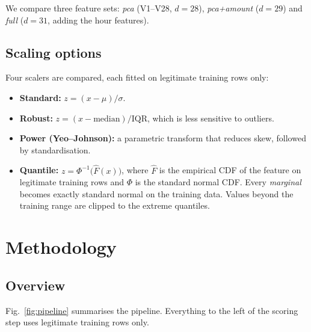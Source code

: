 \documentclass[12pt]{article}
\begin{document}
We compare three feature sets: \emph{pca} (V1--V28, $d{=}28$), \emph{pca+amount} ($d{=}29$) and \emph{full}
($d{=}31$, adding the hour features).

\subsection{Scaling options}
Four scalers are compared, each fitted on legitimate training rows only:
\begin{itemize}
\item \textbf{Standard:} $z=(x-\mu)/\sigma$.
\item \textbf{Robust:} $z=(x-\text{median})/\text{IQR}$, which is less sensitive to outliers.
\item \textbf{Power (Yeo--Johnson):} a parametric transform that reduces skew, followed by standardisation.
\item \textbf{Quantile:} $z=\Phi^{-1}\big(\hat F(x)\big)$, where $\hat F$ is the empirical CDF of the feature on
legitimate training rows and $\Phi$ is the standard normal CDF. Every \emph{marginal} becomes exactly standard normal
on the training data. Values beyond the training range are clipped to the extreme quantiles.
\end{itemize}

\section{Methodology}\label{sec:method}

\subsection{Overview}
Fig.~\ref{fig:pipeline} summarises the pipeline. Everything to the left of the scoring step uses legitimate training
rows only.
\end{document}
